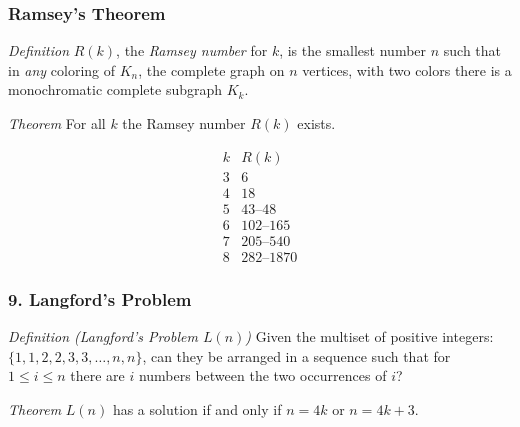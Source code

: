 \documentclass{beamer}
\begin{document}


\begin{frame}
\frametitle{Ramsey's Theorem}
\textit{Definition}
$R(k)$, the \emph{Ramsey number} for $k$, is the smallest number $n$ such that in \emph{any} coloring of $K_{n}$, the complete graph on $n$ vertices, with two colors there is a monochromatic complete subgraph $K_k$.

\bigskip

\textit{Theorem} For all $k$ the Ramsey number $R(k)$ exists.

\[
\begin{array}{r|r}
\hline
k & R(k)\\\hline
3 & 6\\
4 & 18\\
5 & 43\text{--}48\\
6 & 102\text{--}165\\
7 & 205\text{--}540\\
8 & 282\text{--}1870
\end{array}
\]

\end{frame}




\begin{frame}
\frametitle{9. Langford's Problem}
\begin{center}
\end{center}

\pause

\bigskip

\textit{Definition (Langford's Problem $L(n)$)} Given the multiset of positive integers: $\{1,1,2,2,3,3,\ldots,n,n\}$, can they be arranged in a sequence such that for $1\leq i \leq n$ there are $i$ numbers between the two occurrences of $i$\:?

\bigskip

\textit{Theorem} $L(n)$ has a solution if and only if $n=4k$ or $n=4k+3$.

\end{frame}
\end{document}

